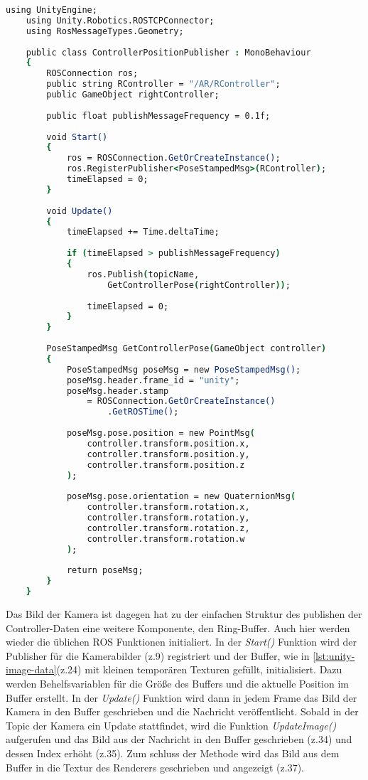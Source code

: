 \begin{lstlisting}[language=csh, caption=Abgreifen der Controller Daten, label=lst:unity-controller-data]
    using UnityEngine;
    using Unity.Robotics.ROSTCPConnector;
    using RosMessageTypes.Geometry;
    
    public class ControllerPositionPublisher : MonoBehaviour
    {
        ROSConnection ros;
        public string RController = "/AR/RController";
        public GameObject rightController;
        
        public float publishMessageFrequency = 0.1f;
    
        void Start()
        {
            ros = ROSConnection.GetOrCreateInstance();
            ros.RegisterPublisher<PoseStampedMsg>(RController);
            timeElapsed = 0;
        }
    
        void Update()
        {
            timeElapsed += Time.deltaTime;
    
            if (timeElapsed > publishMessageFrequency)
            {
                ros.Publish(topicName,
                    GetControllerPose(rightController));
    
                timeElapsed = 0;
            }
        }
    
        PoseStampedMsg GetControllerPose(GameObject controller)
        {
            PoseStampedMsg poseMsg = new PoseStampedMsg();
            poseMsg.header.frame_id = "unity";
            poseMsg.header.stamp
                = ROSConnection.GetOrCreateInstance()
                    .GetROSTime();
            
            poseMsg.pose.position = new PointMsg(
                controller.transform.position.x,
                controller.transform.position.y,
                controller.transform.position.z
            );
            
            poseMsg.pose.orientation = new QuaternionMsg(
                controller.transform.rotation.x,
                controller.transform.rotation.y,
                controller.transform.rotation.z,
                controller.transform.rotation.w
            );
    
            return poseMsg;
        }
    }
\end{lstlisting}
Das Bild der Kamera ist dagegen hat zu der einfachen Struktur des publishen der Controller-Daten eine weitere Komponente, den Ring-Buffer. Auch hier werden wieder die üblichen \ac{ROS} Funktionen initialiert. In der \textit{Start()} Funktion wird der Publisher für die Kamerabilder (z.9) registriert und der Buffer, wie in \autoref{lst:unity-image-data}(z.24) mit kleinen temporären Texturen gefüllt, initialisiert. Dazu werden Behelfsvariablen für die Größe des Buffers und die aktuelle Position im Buffer erstellt. In der \textit{Update()} Funktion wird dann in jedem Frame das Bild der Kamera in den Buffer geschrieben und die Nachricht veröffentlicht. Sobald in der Topic der Kamera ein Update stattfindet, wird die Funktion \textit{UpdateImage()} aufgerufen und das Bild aus der Nachricht in den Buffer geschrieben (z.34) und dessen Index erhöht (z.35). Zum schluss der Methode wird das Bild aus dem Buffer in die Textur des Renderers geschrieben und angezeigt (z.37).\\
